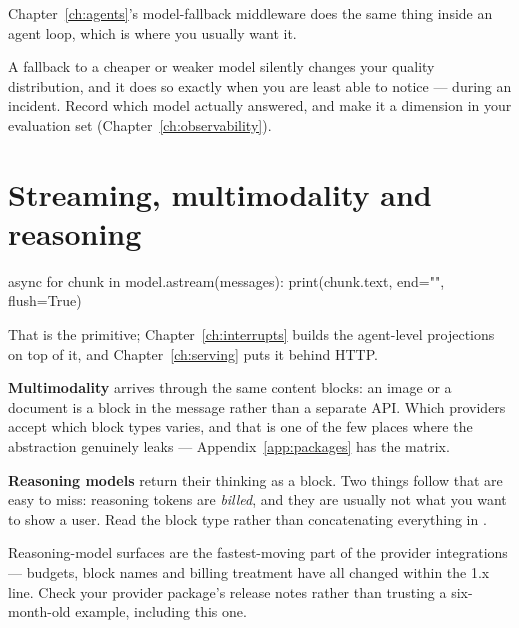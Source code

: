 Chapter~\ref{ch:agents}'s model-fallback middleware does the same thing inside an
agent loop, which is where you usually want it.

\begin{warning}
A fallback to a cheaper or weaker model silently changes your quality
distribution, and it does so exactly when you are least able to notice --- during
an incident. Record which model actually answered, and make it a dimension in
your evaluation set (Chapter~\ref{ch:observability}).
\end{warning}

\section{Streaming, multimodality and reasoning}
\label{sec:streaming-basics}

\begin{python}[caption={The smallest streaming loop}, label={lst:astream}]
async for chunk in model.astream(messages):
    print(chunk.text, end="", flush=True)
\end{python}

That is the primitive; Chapter~\ref{ch:interrupts} builds the agent-level
projections on top of it, and Chapter~\ref{ch:serving} puts it behind HTTP.

\textbf{Multimodality} arrives through the same content blocks: an image or a
document is a block in the message rather than a separate API. Which providers
accept which block types varies, and that is one of the few places where the
abstraction genuinely leaks --- Appendix~\ref{app:packages} has the matrix.

\textbf{Reasoning models} return their thinking as a  block. Two
things follow that are easy to miss: reasoning tokens are \emph{billed}, and they
are usually not what you want to show a user. Read the block type rather than
concatenating everything in .

\begin{versionbox}
Reasoning-model surfaces are the fastest-moving part of the provider integrations
--- budgets, block names and billing treatment have all changed within the 1.x
line. Check your provider package's release notes rather than trusting a
six-month-old example, including this one.
\end{versionbox}

